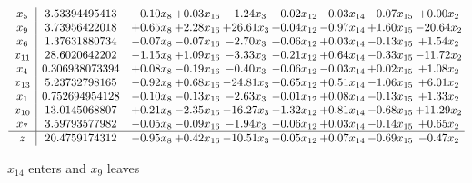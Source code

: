 \documentclass[9pt]{article}
\begin{document}
 \[\begin{array}{c| c c@{\hskip 2pt} c@{\hskip 2pt} c@{\hskip 2pt} c@{\hskip 2pt} c@{\hskip 2pt} c@{\hskip 2pt} c@{\hskip 2pt} }
 x_{5}   &  3.53394495413 & -0.10 x_{8} & +  0.03 x_{16} & -1.24 x_{3} & -0.02 x_{12} & -0.03 x_{14} & -0.07 x_{15} & +  0.00 x_{2}\\
 x_{9}   &  3.73956422018 & +  0.65 x_{8} & +  2.28 x_{16} & + 26.61 x_{3} & +  0.04 x_{12} & -0.97 x_{14} & +  1.60 x_{15} & -20.64 x_{2}\\
 x_{6}   &  1.37631880734 & -0.07 x_{8} & -0.07 x_{16} & -2.70 x_{3} & +  0.06 x_{12} & +  0.03 x_{14} & -0.13 x_{15} & +  1.54 x_{2}\\
 x_{11}   &  28.6020642202 & -1.15 x_{8} & +  1.09 x_{16} & -3.33 x_{3} & -0.21 x_{12} & +  0.64 x_{14} & -0.33 x_{15} & -11.72 x_{2}\\
 x_{4}   &  0.306938073394 & +  0.08 x_{8} & -0.19 x_{16} & -0.40 x_{3} & -0.06 x_{12} & -0.03 x_{14} & +  0.02 x_{15} & +  1.08 x_{2}\\
 x_{13}   &  5.23732798165 & -0.92 x_{8} & +  0.68 x_{16} & -24.81 x_{3} & +  0.65 x_{12} & +  0.51 x_{14} & -1.06 x_{15} & +  6.01 x_{2}\\
 x_{1}   &  0.752694954128 & -0.10 x_{8} & -0.13 x_{16} & -2.63 x_{3} & -0.01 x_{12} & +  0.08 x_{14} & -0.13 x_{15} & +  1.33 x_{2}\\
 x_{10}   &  13.0145068807 & +  0.21 x_{8} & -2.35 x_{16} & -16.27 x_{3} & -1.32 x_{12} & +  0.81 x_{14} & -0.68 x_{15} & + 11.29 x_{2}\\
 x_{7}   &  3.59793577982 & -0.05 x_{8} & -0.09 x_{16} & -1.94 x_{3} & -0.06 x_{12} & +  0.03 x_{14} & -0.14 x_{15} & +  0.65 x_{2}\\
\hline
z    &  20.4759174312 & -0.95 x_{8} & +  0.42 x_{16} & -10.51 x_{3} & -0.05 x_{12} & +  0.07 x_{14} & -0.69 x_{15} & -0.47 x_{2}\\
\end{array}\]


 $ x_{14} $ enters and $ x_{9} $ leaves 
\end{document}
